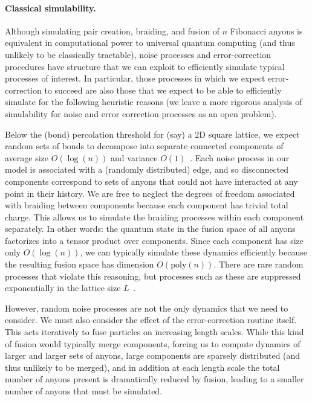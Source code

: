 \documentclass[aps, prl, letterpaper, twocolumn, superscriptaddress, notitlepage, 10pt]{revtex4-1}
\begin{document}
\paragraph{Classical simulability.}

Although simulating pair creation, braiding, and fusion of $n$ Fibonacci anyons is equivalent 
in computational power to universal quantum computing (and thus unlikely to be classically 
tractable), noise processes and error-correction procedures have structure that we can 
exploit to efficiently simulate typical processes of interest. In particular, those 
processes in which we expect error-correction to succeed are also those that we expect to 
be able to efficiently simulate for the following heuristic reasons (we leave a more rigorous analysis of simulability for noise and error correction processes as an open problem).

Below the (bond) percolation threshold for (say) a 2D square lattice, we expect random sets of 
bonds to decompose into separate connected components 
of average size $O(\log(n))$ and variance $O(1)$~\cite{Bazant2000}.
Each noise process in our model is associated with a (randomly distributed) edge, and so 
disconnected components correspond to sets of anyons that could not have interacted at any 
point in their history. 
We are free to neglect the degrees of freedom associated with braiding between components because each component has trivial total charge.
This allows us to simulate the braiding processes within each component separately. 
In other words: the quantum state in the fusion space of all anyons factorizes into 
a tensor product over components. 
Since each 
component has size only $O(\log(n))$, we can typically simulate these dynamics efficiently 
because the resulting fusion space has dimension $O(\mathrm{poly}(n))$. There are rare 
random processes that violate this reasoning, but processes such as these are suppressed 
exponentially in the lattice size $L$~\cite{Grimmett1989}. 

However, random noise processes are not the only dynamics that we need to consider. We 
must also consider the effect of the error-correction routine itself. This acts iteratively to fuse 
particles on increasing length scales. While this kind of fusion would typically merge components, 
forcing us to compute dynamics of larger and larger sets of anyons, large components are sparsely distributed 
(and thus unlikely to be merged), and in addition at each length scale the total number of 
anyons present is dramatically reduced by fusion, leading to a smaller number of anyons that 
must be simulated.
\end{document}
